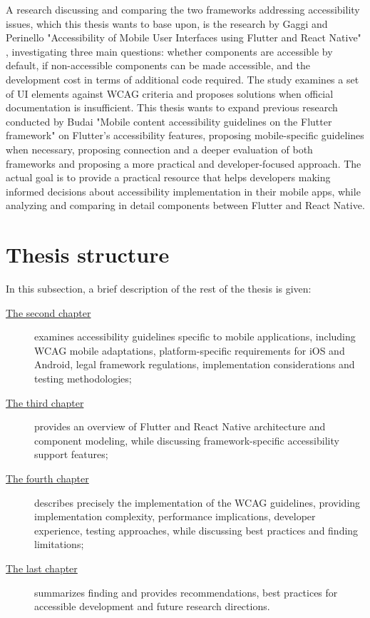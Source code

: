 A research discussing and comparing the two frameworks addressing accessibility issues, which this thesis wants to base upon, is the research by Gaggi and Perinello "Accessibility of Mobile User Interfaces using Flutter and React Native" \cite{perinello2024accessibility}, investigating three main questions: whether components are accessible by default, if non-accessible components can be made accessible, and the development cost in terms of additional code required. The study examines a set of UI elements against WCAG criteria and proposes solutions when official documentation is insufficient. This thesis wants to expand previous research conducted by Budai "Mobile content accessibility guidelines on the Flutter framework" \cite{budai2024mobile} on Flutter's accessibility features, proposing mobile-specific guidelines when necessary, proposing connection and a deeper evaluation of both frameworks and proposing a more practical and developer-focused approach. The actual goal is to provide a practical resource that helps developers making informed decisions about accessibility implementation in their mobile apps, while analyzing and comparing in detail components between Flutter and React Native.  

\section{Thesis structure}
\label{chap:intro-structure} 

In this subsection, a brief description of the rest of the thesis is given:

\begin{description}
    \item[{\hyperref[chap:accessibility]{The second chapter}}]  examines accessibility guidelines specific to mobile applications, including WCAG mobile adaptations, platform-specific requirements for iOS and Android, legal framework regulations, implementation considerations and testing methodologies;
    
    \item[{\hyperref[chap:frameworks]{The third chapter}}] provides an overview of Flutter and React Native architecture and component modeling, while discussing framework-specific accessibility support features;
    
    \item[{\hyperref[chap:implementation]{The fourth chapter}}] describes precisely the implementation of the WCAG guidelines, providing implementation complexity, performance implications, developer experience, testing approaches, while discussing best practices and finding limitations;
    
    \item[{\hyperref[chap:conclusions]{The last chapter}}] summarizes finding and provides recommendations, best practices for accessible development and future research directions.
\end{description}

